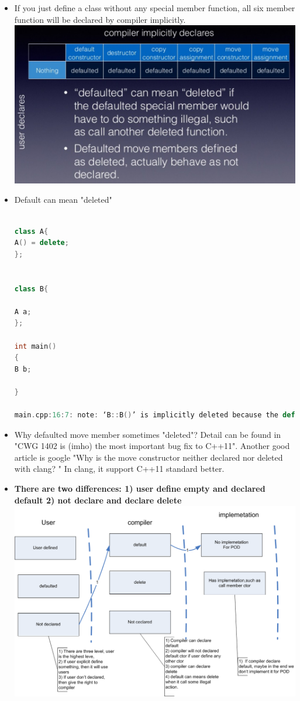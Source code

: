\documentclass[a4paper,12pt,twoside]{book}
\begin{document}
\begin{itemize}
\item If you just define a class without any special member function, all six member function will be declared by compiler implicitly. \\
\includegraphics[scale=0.6]{pics/sm2.png} \newline


\item Default can mean "deleted"

\begin{lstlisting}[frame=single, language=c++]

class A{
A() = delete;
};


class B{

A a;
};

int main()
{
B b;

}

main.cpp:16:7: note: ‘B::B()’ is implicitly deleted because the default definition would be ill-formed:
\end{lstlisting}

\item Why defaulted move member sometimes "deleted"? Detail can be found in "CWG 1402 is (imho) the most important bug fix to C++11". Another good article is google "Why is the move constructor neither declared nor deleted with clang? " In clang, it support C++11 standard better. 

\item \textbf{There are two differences: 1) user define empty and declared default 2) not declare and declare delete}
\includegraphics[scale=0.6]{pics/ctor.png} \newline




\end{itemize}
\end{document}
